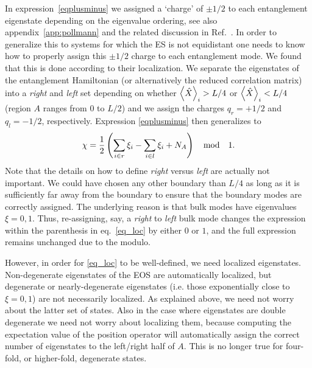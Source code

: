 \documentclass[twocolumn,amsmath,longbibliography,amssymb,superscriptaddress]{revtex4-1}
\newcommand{\mariac}[1]{{\it\color{cyan}#1}}
\begin{document}
In expression~\eqref{eqplusminus} we assigned a `charge'  of $\pm1/2$ to each entanglement eigenstate depending on the eigenvalue ordering, see also appendix~\ref{app:pollmann} and the related discussion in Ref.~\cite{Zaletel2014}. 
In order to generalize this to systems for which the ES is not equidistant  one needs to know how to properly assign this $\pm 1/2$ charge to each entanglement mode. We found that this is done according to their localization. 
We separate the eigenstates of the entanglement Hamiltonian (or alternatively the reduced correlation matrix) into a \emph{right} and \emph{left} set depending on whether $\expval{\hat{X}}_i > L/4$ or $\expval{\hat{X}}_i < L/4$ (region $A$ ranges from $0$ to $L/2$) and we assign the charges $q_r = +1/2$ and $q_l = -1/2$, respectively.
 Expression \eqref{eqplusminus} then generalizes to
\begin{equation}
\chi = \frac{1}{2} \left( \sum_{i\in r}\xi_i-\sum_{i\in l}\xi_i+ N_A \right) \quad {\rm mod} \quad 1.
\label{eq_loc}
\end{equation}
Note that the details on how to define \emph{right} versus \emph{left} are actually not important. 
We could have chosen any other boundary than $L/4$ as long as it is sufficiently far away from the boundary to ensure that the boundary modes are correctly assigned. 
The underlying reason is that  bulk modes have eigenvalues $\xi=0,1$.
Thus, re-assigning, say, a \emph{right} to  \emph{left} bulk mode changes the expression within the parenthesis in eq.~\eqref{eq_loc} by either $0$ or $1$, and the full expression remains unchanged due to the modulo. 


However, in order for  \eqref{eq_loc} to be well-defined,  we need localized eigenstates. 
Non-degenerate eigenstates of the EOS are automatically localized, but degenerate or nearly-degenerate eigenstates (i.e. those exponentially close to $\xi=0,1$) are not necessarily localized. 
As explained above, we need not worry about the latter set of states.
Also in the case where eigenstates are double degenerate we need not worry about localizing them, because computing the expectation value of the position operator will automatically assign the correct number of eigenstates to the left/right half of $A$. 
This is no longer true for four-fold, or higher-fold, degenerate states.
\end{document}
